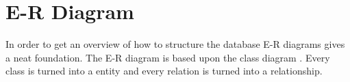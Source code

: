 \newcommand{\erdiagram}[1][]{E-R diagram}
\section{E-R Diagram}
In order to get an overview of how to structure the database \erdiagram[]s gives a neat foundation. The \erdiagram[] is based upon the class diagram . Every class is turned into a entity and every relation is turned into a relationship. 